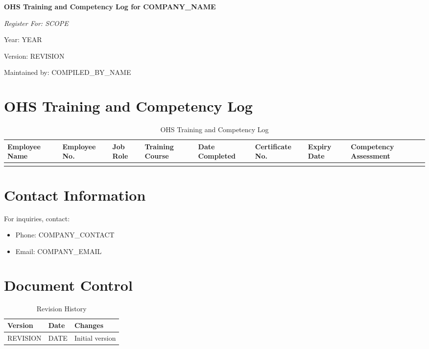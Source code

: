 \documentclass[12pt]{article}
\begin{document}
\begin{titlepage}
    \centering
    \vspace*{2cm}
    {\LARGE\bfseries OHS Training and Competency Log for {{COMPANY_NAME}}\par}
    \vspace{1cm}
    {\large\itshape Register For: {{SCOPE}}\par}
    \vspace{0.5cm}
    {\normalsize Year: {{YEAR}}\par}
    \vspace{0.5cm}
    {\normalsize Version: {{REVISION}}\par}
    \vspace{0.5cm}
    {\normalsize Maintained by: {{COMPILED_BY_NAME}}\par}
\end{titlepage}

\section{OHS Training and Competency Log}

\begin{table}[h]
    \centering
    \begin{tabular}{p{2cm}p{2cm}p{2cm}p{2cm}p{2cm}p{2cm}p{2cm}p{2cm}}
        \toprule
        \textbf{Employee Name} & \textbf{Employee No.} & \textbf{Job Role} & \textbf{Training Course} & \textbf{Date Completed} & \textbf{Certificate No.} & \textbf{Expiry Date} & \textbf{Competency Assessment} \\
        \midrule
        & & & & & & & \\
        \bottomrule
    \end{tabular}
    \caption{OHS Training and Competency Log}
\end{table}

\section{Contact Information}
For inquiries, contact:
\begin{itemize}
    \item Phone: {{COMPANY_CONTACT}}
    \item Email: {{COMPANY_EMAIL}}
\end{itemize}

\section{Document Control}
\begin{table}[h]
    \centering
    \begin{tabular}{p{3cm}p{3cm}p{6cm}}
        \toprule
        \textbf{Version} & \textbf{Date} & \textbf{Changes} \\
        \midrule
        {{REVISION}} & {{DATE}} & Initial version \\
        \bottomrule
    \end{tabular}
    \caption{Revision History}
\end{table}
\end{document}
